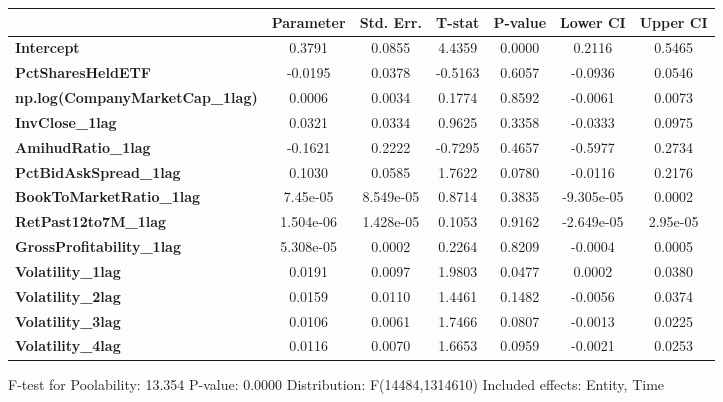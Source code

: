 \begin{center}
\begin{tabular}{lclc}
\bottomrule
\end{tabular}
\begin{tabular}{lcccccc}
                                        & \textbf{Parameter} & \textbf{Std. Err.} & \textbf{T-stat} & \textbf{P-value} & \textbf{Lower CI} & \textbf{Upper CI}  \\
\midrule
\textbf{Intercept}                      &       0.3791       &       0.0855       &      4.4359     &      0.0000      &       0.2116      &       0.5465       \\
\textbf{PctSharesHeldETF}               &      -0.0195       &       0.0378       &     -0.5163     &      0.6057      &      -0.0936      &       0.0546       \\
\textbf{np.log(CompanyMarketCap\_1lag)} &       0.0006       &       0.0034       &      0.1774     &      0.8592      &      -0.0061      &       0.0073       \\
\textbf{InvClose\_1lag}                 &       0.0321       &       0.0334       &      0.9625     &      0.3358      &      -0.0333      &       0.0975       \\
\textbf{AmihudRatio\_1lag}              &      -0.1621       &       0.2222       &     -0.7295     &      0.4657      &      -0.5977      &       0.2734       \\
\textbf{PctBidAskSpread\_1lag}          &       0.1030       &       0.0585       &      1.7622     &      0.0780      &      -0.0116      &       0.2176       \\
\textbf{BookToMarketRatio\_1lag}        &      7.45e-05      &     8.549e-05      &      0.8714     &      0.3835      &     -9.305e-05    &       0.0002       \\
\textbf{RetPast12to7M\_1lag}            &     1.504e-06      &     1.428e-05      &      0.1053     &      0.9162      &     -2.649e-05    &      2.95e-05      \\
\textbf{GrossProfitability\_1lag}       &     5.308e-05      &       0.0002       &      0.2264     &      0.8209      &      -0.0004      &       0.0005       \\
\textbf{Volatility\_1lag}               &       0.0191       &       0.0097       &      1.9803     &      0.0477      &       0.0002      &       0.0380       \\
\textbf{Volatility\_2lag}               &       0.0159       &       0.0110       &      1.4461     &      0.1482      &      -0.0056      &       0.0374       \\
\textbf{Volatility\_3lag}               &       0.0106       &       0.0061       &      1.7466     &      0.0807      &      -0.0013      &       0.0225       \\
\textbf{Volatility\_4lag}               &       0.0116       &       0.0070       &      1.6653     &      0.0959      &      -0.0021      &       0.0253       \\
\bottomrule
\end{tabular}
\end{center}

F-test for Poolability: 13.354 \newline
 P-value: 0.0000 \newline
 Distribution: F(14484,1314610) \newline
  \newline
 Included effects: Entity, Time